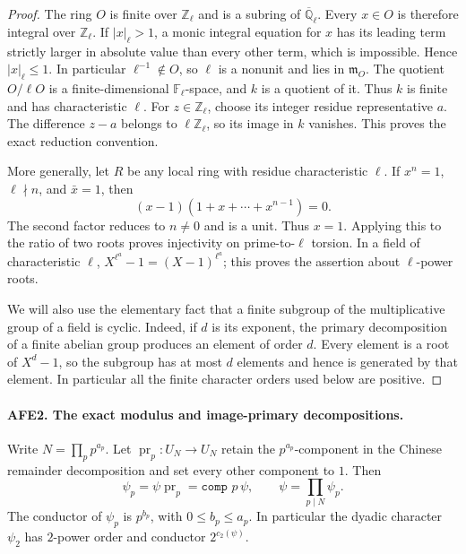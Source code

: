 \documentclass[11pt,a4paper]{article}
\numberwithin{equation}{section}
\theoremstyle{remark}\newtheorem{remark}[theorem]{Remark}
\begin{document}
\begin{proof}
The ring \(O\) is finite over \(\mathbb Z_\ell\) and is a
subring of \(\overline{\mathbb Q}_\ell\).
Every \(x\in O\) is therefore integral over \(\mathbb Z_\ell\).
If \(|x|_\ell>1\), a monic integral equation for \(x\) has
its leading term strictly larger in absolute value than
every other term, which is impossible.  Hence
\(|x|_\ell\le1\).  In particular \(\ell^{-1}\notin O\), so
\(\ell\) is a nonunit and lies in \(\mathfrak m_O\).
The quotient \(O/\ell O\) is a finite-dimensional
\(\mathbb F_\ell\)-space, and \(k\) is a quotient of it.
Thus \(k\) is finite and has characteristic \(\ell\).
For \(z\in\mathbb Z_\ell\), choose its integer residue
representative \(a\).  The difference \(z-a\) belongs to
\(\ell\mathbb Z_\ell\), so its image in \(k\) vanishes.
This proves the exact reduction convention.

More generally, let \(R\) be any local ring with residue
characteristic \(\ell\).  If \(x^n=1\), \(\ell\nmid n\),
and \(\bar x=1\), then
\[
 (x-1)(1+x+\cdots+x^{n-1})=0.
\]
The second factor reduces to \(n\ne0\) and is a unit.
Thus \(x=1\).  Applying this to the ratio of two roots
proves injectivity on prime-to-\(\ell\) torsion.
In a field of characteristic \(\ell\),
\(X^{\ell^a}-1=(X-1)^{\ell^a}\); this proves the
assertion about \(\ell\)-power roots.

We will also use the elementary fact that a finite subgroup
of the multiplicative group of a field is cyclic.  Indeed,
if \(d\) is its exponent, the primary decomposition of a
finite abelian group produces an element of order \(d\).
Every element is a root of \(X^d-1\), so the subgroup has
at most \(d\) elements and hence is generated by that
element.  In particular all the finite character orders
used below are positive.
\end{proof}

\paragraph{AFE2. The exact modulus and image-primary decompositions.}
\label{claim:AFE2}
Write \(N=\prod_p p^{a_p}\).
Let \(\operatorname{pr}_p:U_N\to U_N\) retain the
\(p^{a_p}\)-component in the Chinese remainder decomposition
and set every other component to \(1\).  Then
\[
 \psi_p=\psi\operatorname{pr}_p=\texttt{comp }p\,\psi,\qquad
 \psi=\prod_{p\mid N}\psi_p.                              \tag{AFE.2}
\]
The conductor of \(\psi_p\) is \(p^{b_p}\), with
\(0\le b_p\le a_p\).  In particular the dyadic character
\(\psi_2\) has \(2\)-power order and conductor
\(2^{c_2(\psi)}\).
\end{document}
